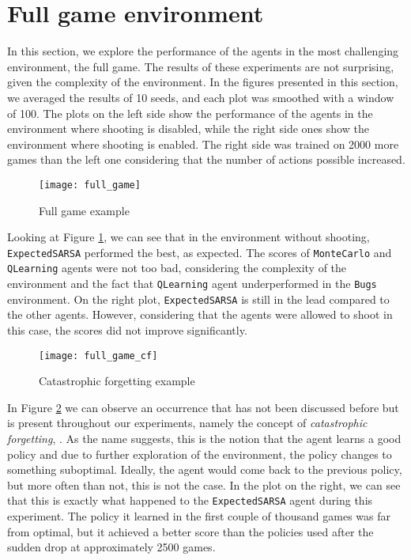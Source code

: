 \section{Full game environment}
In this section, we explore the performance of the agents in the most challenging environment, the full game. The results of these experiments are not surprising, given the complexity of the environment. In the figures presented in this section, we averaged the results of 10 seeds, and each plot was smoothed with a window of 100. The plots on the left side show the performance of the agents in the environment where shooting is disabled, while the right side ones show the environment where shooting is enabled. The right side was trained on 2000 more games than the left one considering that the number of actions possible increased.

\begin{figure}[h]
    \centering
    \texttt{[image: full\_game]}
    \caption{Full game example}
    \label{fig:full_game_eg}
\end{figure}

Looking at Figure \ref{fig:full_game_eg}, we can see that in the environment without shooting, \texttt{ExpectedSARSA} performed the best, as expected. The scores of \texttt{MonteCarlo} and \texttt{QLearning} agents were not too bad, considering the complexity of the environment and the fact that \texttt{QLearning} agent underperformed in the \texttt{Bugs} environment. On the right plot, \texttt{ExpectedSARSA} is still in the lead compared to the other agents. However, considering that the agents were allowed to shoot in this case, the scores did not improve significantly.

\begin{figure}[h]
    \centering
    \texttt{[image: full\_game\_cf]}
    \caption{Catastrophic forgetting example}
    \label{fig:full_game_cf_eg}
\end{figure}

In Figure \ref{fig:full_game_cf_eg} we can observe an occurrence that has not been discussed before but is present throughout our experiments, namely the concept of \textit{catastrophic forgetting}, \cite{russell2010artificial}. As the name suggests, this is the notion that the agent learns a good policy and due to further exploration of the environment, the policy changes to something suboptimal. Ideally, the agent would come back to the previous policy, but more often than not, this is not the case. In the plot on the right, we can see that this is exactly what happened to the \texttt{ExpectedSARSA} agent during this experiment. The policy it learned in the first couple of thousand games was far from optimal, but it achieved a better score than the policies used after the sudden drop at approximately 2500 games.

